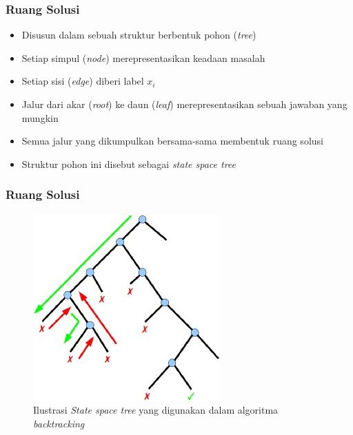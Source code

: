 \documentclass{beamer}
\begin{document}
\begin{frame}
\frametitle{Ruang Solusi}
\begin{itemize}
\item Disusun dalam sebuah struktur berbentuk pohon (\textit{tree})
\item Setiap simpul (\textit{node}) merepresentasikan keadaan masalah
\item Setiap sisi (\textit{edge}) diberi label \begin{math}x_i\end{math}
\item Jalur dari akar (\textit{root}) ke daun (\textit{leaf}) merepresentasikan sebuah jawaban yang mungkin
\item Semua jalur yang dikumpulkan bersama-sama membentuk ruang solusi
\item Struktur pohon ini disebut sebagai \textit{state space tree}
\end{itemize}
\end{frame}


\begin{frame}
\frametitle{Ruang Solusi}
\begin{figure}
\centering
\captionsetup{justification=centering}
\includegraphics[scale=1]{Gambar/Backtracking3}
\caption[Ilustrasi \textit{State space tree} yang digunakan dalam algoritma  \textit{backtracking}]{Ilustrasi \textit{State space tree} yang digunakan dalam algoritma \textit{backtracking}}
\label{fig:backtracking3}
\end{figure}
\end{frame}
\end{document}
